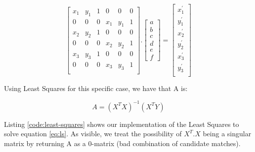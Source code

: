 \documentclass[]{IEEEtran}
\begin{document}
\begin{equation}
  \begin{bmatrix}
    x_{1} & y_{1} & 1 & 0 & 0 & 0 \\
    0 & 0 & 0 & x_{1} & y_{1} & 1 \\
    x_{2} & y_{2} & 1 & 0 & 0 & 0 \\
    0 & 0 & 0 & x_{2} & y_{2} & 1 \\
    x_{3} & y_{3} & 1 & 0 & 0 & 0 \\
    0 & 0 & 0 & x_{3} & y_{3} & 1 \\
  \end{bmatrix}
  .
  \begin{bmatrix}
      a \\
      b \\
      c \\
      d \\
      e \\
      f
  \end{bmatrix} = 
  \begin{bmatrix}
    x_{1}^{'} \\
    y_{1}^{'} \\
    x_{2}^{'} \\
    y_{2}^{'} \\
    x_{3}^{'} \\
    y_{3}^{'} \\
  \end{bmatrix}
\end{equation}

Using Least Squares for this specific case, we have that A is:

\begin{equation}
  A = (X^{T}X)^{-1}(X^{T}Y)
  \label{eq:ls}
\end{equation}

Listing \ref{code:least-squares} shows our implementation of the Least Squares to solve equation \ref{eq:ls}. As visible, we treat the possibility of $X^{T}.X$ being a singular matrix by returning A as a 0-matrix (bad combination of candidate matches).
\end{document}
